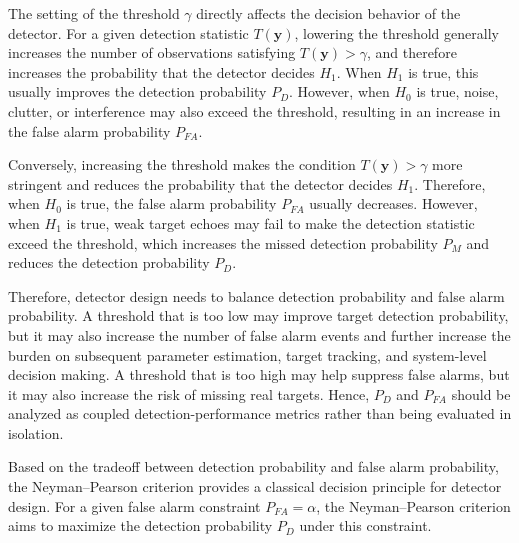 The setting of the threshold \(\gamma\) directly affects the decision behavior
of the detector.
For a given detection statistic \(T(\mathbf{y})\), lowering the threshold
generally increases the number of observations satisfying
\(T(\mathbf{y})>\gamma\), and therefore increases the probability that the
detector decides \(H_1\).
When \(H_1\) is true, this usually improves the detection probability \(P_D\).
However, when \(H_0\) is true, noise, clutter, or interference may also exceed
the threshold, resulting in an increase in the false alarm probability
\(P_{FA}\).

Conversely, increasing the threshold makes the condition
\(T(\mathbf{y})>\gamma\) more stringent and reduces the probability that the
detector decides \(H_1\).
Therefore, when \(H_0\) is true, the false alarm probability \(P_{FA}\) usually
decreases.
However, when \(H_1\) is true, weak target echoes may fail to make the
detection statistic exceed the threshold, which increases the missed detection
probability \(P_M\) and reduces the detection probability \(P_D\).

Therefore, detector design needs to balance detection probability and false
alarm probability.
A threshold that is too low may improve target detection probability, but it
may also increase the number of false alarm events and further increase the
burden on subsequent parameter estimation, target tracking, and system-level
decision making.
A threshold that is too high may help suppress false alarms, but it may also
increase the risk of missing real targets.
Hence, \(P_D\) and \(P_{FA}\) should be analyzed as coupled
detection-performance metrics rather than being evaluated in isolation.

Based on the tradeoff between detection probability and false alarm probability,
the Neyman--Pearson criterion provides a classical decision principle for
detector design.
For a given false alarm constraint \(P_{FA}=\alpha\), the Neyman--Pearson
criterion aims to maximize the detection probability \(P_D\) under this
constraint.

